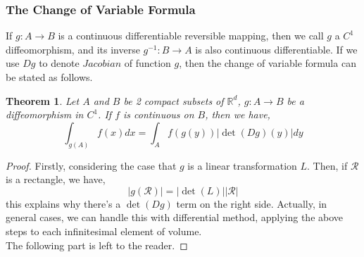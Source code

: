 \documentclass[a4paper]{article}
\newtheorem{theorem}{Theorem}[subsection]
\numberwithin{equation}{subsection}
\begin{document}
\subsubsection{The Change of Variable Formula}
\par If $g:A\to B$ is a continuous differentiable reversible mapping, then we call $g$ a $C^1$ diffeomorphism, and its inverse $g^{-1}:B\to A$ is also continuous differentiable. If we use $D g$ to denote $Jacobian$ of function $g$, then the change of variable formula can be stated as follows.

\begin{theorem}
    Let $A$ and $B$ be 2 compact subsets of $\mathbb{R}^d$, $g:A\to B$ be a diffeomorphism in $C^1$. If $f$ is continuous on $B$, then we have,
    \begin{equation}
        \int_{g(A)} f(x) dx = \int_{A} f(g(y)) \lvert \det(D g)(y) \rvert dy
    \end{equation}
\end{theorem}
\begin{proof}
    Firstly, considering the case that $g$ is a linear transformation $L$. Then, if $\mathcal{R}$ is a rectangle, we have,
    \begin{equation}
        \lvert g(\mathcal{R}) \rvert = \lvert \det (L) \rvert \lvert \mathcal{R} \rvert
    \end{equation}
    this explains why there's a $\det (D g)$ term on the right side. Actually, in general cases, we can handle this with differential method, applying the above steps to each infinitesimal element of volume. \\
    The following part is left to the reader.
\end{proof}
\end{document}
